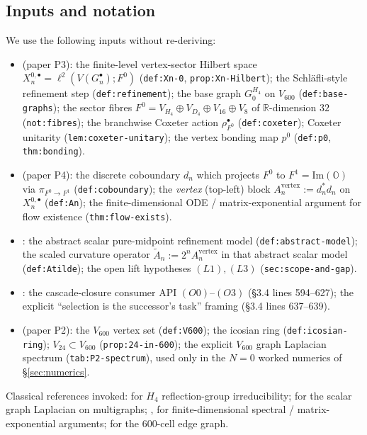 \documentclass[11pt]{article}
\newcommand{\OO}{\mathbb{O}}
\newcommand{\R}{\mathbb{R}}
\theoremstyle{definition}
\begin{document}
\subsection{Inputs and notation}

We use the following inputs without re-deriving:
\begin{itemize}
\item \cite{RefinementSpaces} (paper P3): the finite-level
  vertex-sector Hilbert space
  $X_n^{0, \bullet} = \ell^2(V(G_n^\bullet); F^0)$
  (\texttt{def:Xn-0}, \texttt{prop:Xn-Hilbert}); the
  Schl\"{a}fli-style refinement step (\texttt{def:refinement});
  the base graph $G_0^{H_4}$ on $V_{600}$
  (\texttt{def:base-graphs}); the sector fibres $F^0 = V_{H_4}
  \oplus V_{D_4} \oplus V_{16} \oplus V_8$ of $\R$-dimension
  $32$ (\texttt{not:fibres}); the branchwise Coxeter action
  $\rho_{F^0}^\bullet$ (\texttt{def:coxeter}); Coxeter unitarity
  (\texttt{lem:coxeter-unitary}); the vertex bonding map $p^0$
  (\texttt{def:p0}, \texttt{thm:bonding}).
\item \cite{ClosureDynamics} (paper P4): the discrete coboundary
  $d_n$ which projects $F^0$ to $F^1 = \mathrm{Im}(\OO)$ via
  $\pi_{F^0 \to F^1}$ (\texttt{def:coboundary}); the
  \emph{vertex} (top-left) block $A_n^{\mathrm{vertex}} :=
  d_n^{*} d_n$ on $X_n^{0, \bullet}$ (\texttt{def:An}); the
  finite-dimensional ODE / matrix-exponential argument for flow
  existence (\texttt{thm:flow-exists}).
\item \cite{RefinementCompat}: the abstract scalar pure-midpoint
  refinement model (\texttt{def:abstract-model}); the scaled
  curvature operator $\widetilde A_n := 2^n A_n^{\mathrm{vertex}}$
  in that abstract scalar model (\texttt{def:Atilde}); the
  open lift hypotheses $(L1), (L3)$
  (\texttt{sec:scope-and-gap}).
\item \cite{CascadeMechanism}: the cascade-closure consumer API
  $(O0)$--$(O3)$ (\S 3.4 lines 594--627); the explicit
  ``selection is the successor's task'' framing (\S 3.4 lines
  637--639).
\item \cite{AlgebraicSubstrate} (paper P2): the $V_{600}$
  vertex set (\texttt{def:V600}); the icosian ring
  (\texttt{def:icosian-ring}); $V_{24} \subset V_{600}$
  (\texttt{prop:24-in-600}); the explicit $V_{600}$ graph
  Laplacian spectrum (\texttt{tab:P2-spectrum}), used only in
  the $N = 0$ worked numerics of \S\ref{sec:numerics}.
\end{itemize}

Classical references invoked: \cite{Humphreys} for $H_4$
reflection-group irreducibility; \cite{Chung} for the scalar
graph Laplacian on multigraphs; \cite{ReedSimonI},
\cite{HornJohnson} for finite-dimensional spectral / matrix-exponential
arguments; \cite{CoxeterRegularPolytopes} for the $600$-cell edge
graph.
\end{document}
